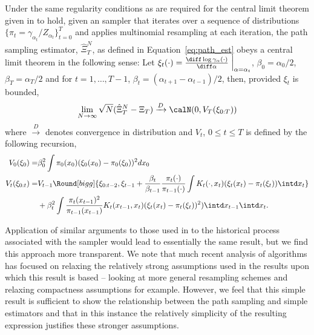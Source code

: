 \begin{proposition}\label{prop:path_clt}
  Under the same regularity conditions as are required for the central limit
  theorem given in \cite{DelMoral:2006hc} to hold, given an \smc sampler that
  iterates over a sequence of distributions $\{\pi_t =
  \gamma_{\alpha_t}/Z_{\alpha_t}\}_{t=0}^T$ and applies multinomial resampling
  at each iteration, the path sampling estimator, $\hat\Xi_{T}^{N}$, as
  defined in Equation~\eqref{eq:path_est} obeys a central limit theorem in the
  following sense: Let $\xi_t(\cdot) = \frac{\diff\log
    \gamma_{\alpha}(\cdot)}{\diff\alpha}\Bigm|_{\alpha = \alpha_t}$,
  $\beta_{0} = \alpha_0 / 2$, $\beta_{T} = \alpha_T / 2$ and for $t =
  1,\ldots,T-1$, $\beta_t = (\alpha_{t + 1} - \alpha_{t-1})/2$, then,
  provided $\xi_t$ is bounded,
  \begin{equation}
    \lim_{N\to\infty}\sqrt{N}(\hat\Xi_{T}^{N} - \Xi_T)
    \xrightarrow{D}\calN(0, V_T(\xi_{0:T}))
  \end{equation}
  where $\xrightarrow{D}$ denotes convergence in distribution and $V_t$, $0\le
  t \le T$ is defined by the following recursion,
  \begin{align}
    V_0(\xi_0) =&  \beta_0^2
    \int \pi_0(x_0) (\xi_0(x_0)
    - \pi_0(\xi_0))^2 dx_0 \\
    V_t(\xi_{0:t}) =& V_{t-1}\Round[bigg]{\xi_{0:t-2}, \xi_{t-1}
    + \frac{\beta_t}{\beta_{t-1}}
    \frac{\pi_{t}(\cdot)}{\pi_{t-1}(\cdot)}
    \int K_t(\cdot,x_t) (\xi_t(x_t)-\pi_t(\xi_t)) \intd x_t
    } \\\notag
    &+ \beta_t^2 \int\frac{\pi_t(x_{t-1})^2}{\pi_{t-1}(x_{t-1})}
    K_t(x_{t-1},x_t)(\xi_t(x_t) - \pi_t(\xi_t))^2) \intd x_{t-1} \intd x_t.
  \end{align}
\end{proposition}

Application of similar arguments to those used in \cite{DelMoral:2006hc} to
the historical process associated with the \smc sampler would lead to
essentially the same result, but we find this approach more transparent. We
note that much recent analysis of \smc algorithms has focused on relaxing the
relatively strong assumptions used in the results upon which this result is
based -- looking at more general resampling schemes \cite{DelMoral:2012jq} and
relaxing compactness assumptions \cite{Whiteley:2013vx} for example. However,
we feel that this simple result is sufficient to show the relationship between
the path sampling and simple estimators and that in this instance the
relatively simplicity of the resulting expression justifies these stronger
assumptions.

